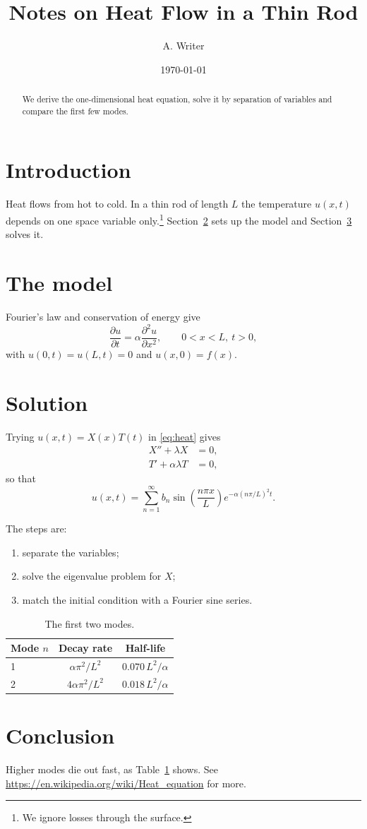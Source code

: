 \documentclass[11pt,a4paper]{article}
\title{Notes on Heat Flow in a Thin Rod}
\author{A. Writer}
\date{\today}
\begin{document}
\maketitle

\begin{abstract}
We derive the one-dimensional heat equation, solve it by separation of variables
and compare the first few modes.
\end{abstract}

\section{Introduction}\label{sec:intro}
Heat flows from hot to cold. In a thin rod of length $L$ the temperature $u(x,t)$
depends on one space variable only.\footnote{We ignore losses through the surface.}
Section~\ref{sec:model} sets up the model and Section~\ref{sec:solution} solves it.

\section{The model}\label{sec:model}
Fourier's law and conservation of energy give
\begin{equation}\label{eq:heat}
  \frac{\partial u}{\partial t} = \alpha \frac{\partial^2 u}{\partial x^2}, \qquad 0 < x < L,\ t > 0,
\end{equation}
with $u(0,t) = u(L,t) = 0$ and $u(x,0) = f(x)$.

\section{Solution}\label{sec:solution}
Trying $u(x,t) = X(x)T(t)$ in \eqref{eq:heat} gives
\begin{align*}
  X'' + \lambda X &= 0, \\
  T' + \alpha\lambda T &= 0,
\end{align*}
so that
\[
  u(x,t) = \sum_{n=1}^{\infty} b_n \sin\left(\frac{n\pi x}{L}\right) e^{-\alpha (n\pi/L)^2 t}.
\]

The steps are:
\begin{enumerate}
  \item separate the variables;
  \item solve the eigenvalue problem for $X$;
  \item match the initial condition with a Fourier sine series.
\end{enumerate}

\begin{table}[h]
  \centering
  \begin{tabular}{lcc}
    \toprule
    Mode $n$ & Decay rate & Half-life \\
    \midrule
    1 & $\alpha\pi^2/L^2$  & $0.070\,L^2/\alpha$ \\
    2 & $4\alpha\pi^2/L^2$ & $0.018\,L^2/\alpha$ \\
    \bottomrule
  \end{tabular}
  \caption{The first two modes.}\label{tab:modes}
\end{table}

\section{Conclusion}
Higher modes die out fast, as Table~\ref{tab:modes} shows. See
\url{https://en.wikipedia.org/wiki/Heat_equation} for more.
\end{document}
